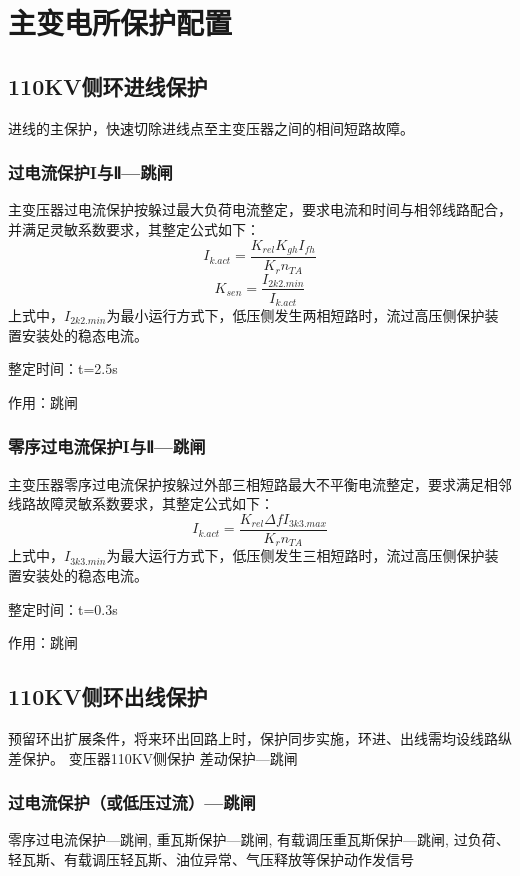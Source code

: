 \chapter{主变电所保护配置}


\section{110KV侧环进线保护}
进线的主保护，快速切除进线点至主变压器之间的相间短路故障。
\subsection{过电流保护I与Ⅱ---跳闸}
主变压器过电流保护按躲过最大负荷电流整定，要求电流和时间与相邻线路配合，并满足灵敏系数要求，其整定公式如下：
$$
I_{k.act}=\frac{K_{rel}K_{gh}I_{fh}}{K_rn_{TA}}
$$ 
$$
K_{sen}=\frac{I_{2k2.min}}{I_{k.act}}
$$
上式中，$I_{2k2.min}$为最小运行方式下，低压侧发生两相短路时，流过高压侧保护装置安装处的稳态电流。\par 
整定时间：t=2.5s\par 
作用：跳闸

\subsection{零序过电流保护I与Ⅱ---跳闸}
主变压器零序过电流保护按躲过外部三相短路最大不平衡电流整定，要求满足相邻线路故障灵敏系数要求，其整定公式如下：
$$
I_{k.act}=\frac{K_{rel}\varDelta fI_{3k3.max}}{K_rn_{TA}}
$$
上式中，$I_{3k3.min}$为最大运行方式下，低压侧发生三相短路时，流过高压侧保护装置安装处的稳态电流。\par 
整定时间：t=0.3s\par
作用：跳闸
\section{110KV侧环出线保护}
预留环出扩展条件，将来环出回路上时，保护同步实施，环进、出线需均设线路纵差保护。
变压器110KV侧保护
差动保护---跳闸
\subsection{过电流保护（或低压过流）---跳闸}
零序过电流保护---跳闸,
重瓦斯保护---跳闸,
有载调压重瓦斯保护---跳闸,
过负荷、轻瓦斯、有载调压轻瓦斯、油位异常、气压释放等保护动作发信号
